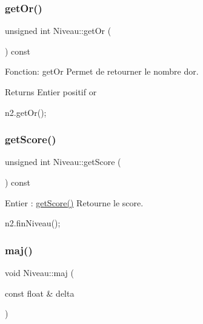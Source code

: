 \subsubsection{\texorpdfstring{get\+Or()}{getOr()}}
{\footnotesize\ttfamily unsigned int Niveau\+::get\+Or (\begin{DoxyParamCaption}{ }\end{DoxyParamCaption}) const}



Fonction\+: get\+Or Permet de retourner le nombre d\textquotesingle{}or. 

\begin{DoxyReturn}{Returns}
Entier positif or 
\begin{DoxyCode}
n2.getOr();
\end{DoxyCode}
 
\end{DoxyReturn}
\mbox{\label{classNiveau_a8428b988346e7a5cf4cb2add69f8b16d}} 
\subsubsection{\texorpdfstring{get\+Score()}{getScore()}}
{\footnotesize\ttfamily unsigned int Niveau\+::get\+Score (\begin{DoxyParamCaption}{ }\end{DoxyParamCaption}) const}



Entier \+: \hyperlink{classNiveau_a8428b988346e7a5cf4cb2add69f8b16d}{get\+Score()} Retourne le score. 


\begin{DoxyCode}
n2.finNiveau();
\end{DoxyCode}
 \mbox{\label{classNiveau_a3d1e0f0ec2d7b72eae985d0448c17dd5}} 
\subsubsection{\texorpdfstring{maj()}{maj()}}
{\footnotesize\ttfamily void Niveau\+::maj (\begin{DoxyParamCaption}\item[{const float \&}]{delta }\end{DoxyParamCaption})}



